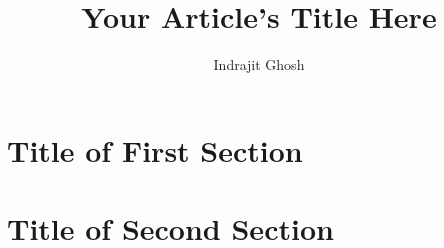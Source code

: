 \documentclass[12pt]{amsart}
\begin{document}
    \title{Your Article's Title Here}
    \author{Indrajit Ghosh}
    \address{Indian Statistical Institute, 8th Mile, Mysore Road, RVCE Post, Bengaluru - 560059, Karnataka, India}


    \maketitle

    \tableofcontents %


    \begin{abstract}
    \lipsum[1]
    \end{abstract}



    \section{Title of First Section}
    \lipsum[1-2]

    \section{Title of Second Section}
    \lipsum[2-3]



    

    \medskip
    \nocite{*}
     
\end{document}
